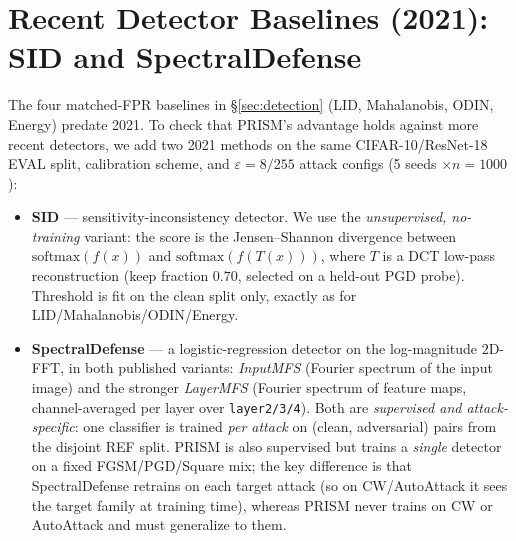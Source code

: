 
\section{Recent Detector Baselines (2021): SID and SpectralDefense}
\label{app:recent_baselines}

The four matched-FPR baselines in \S\ref{sec:detection}
(LID, Mahalanobis, ODIN, Energy) predate 2021. To check that PRISM's
advantage holds against more recent detectors, we add two 2021 methods
on the same CIFAR-10/ResNet-18 EVAL split, calibration scheme, and
$\varepsilon{=}8/255$ attack configs (5 seeds $\times n{=}1000$):

\begin{itemize}
\item \textbf{SID} \cite{tian2021detecting} --- sensitivity-inconsistency
  detector. We use the \emph{unsupervised, no-training} variant: the score
  is the Jensen--Shannon divergence between $\mathrm{softmax}(f(x))$ and
  $\mathrm{softmax}(f(T(x)))$, where $T$ is a DCT low-pass reconstruction
  (keep fraction $0.70$, selected on a held-out PGD probe). Threshold is
  fit on the clean split only, exactly as for LID/Mahalanobis/ODIN/Energy.
\item \textbf{SpectralDefense} \cite{harder2021spectraldefense} ---
  a logistic-regression detector on the log-magnitude $2$D-FFT, in both
  published variants: \emph{InputMFS} (Fourier spectrum of the input image)
  and the stronger \emph{LayerMFS} (Fourier spectrum of feature maps,
  channel-averaged per layer over \texttt{layer2/3/4}). Both are
  \emph{supervised and attack-specific}: one classifier is trained \emph{per
  attack} on (clean, adversarial) pairs from the disjoint REF split. PRISM is
  also supervised but trains a \emph{single} detector on a fixed
  FGSM/PGD/Square mix; the key difference is that SpectralDefense retrains on
  each target attack (so on CW/AutoAttack it sees the target family at training
  time), whereas PRISM never trains on CW or AutoAttack and must generalize to
  them.
\end{itemize}

